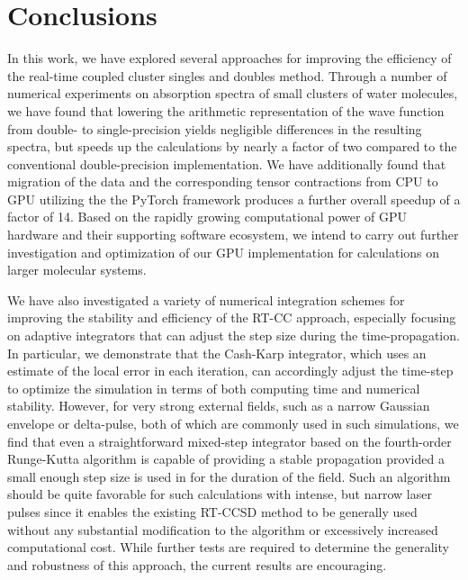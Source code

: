 \section{Conclusions} \label{conc}

In this work, we have explored several approaches for improving the
efficiency of the real-time coupled cluster singles and doubles method.
Through a number of numerical experiments on absorption spectra of small
clusters of water molecules, we have found that lowering the arithmetic
representation of the wave function from double- to single-precision yields
negligible differences in the resulting spectra, but speeds up the
calculations by nearly a factor of two compared to the conventional
double-precision implementation.  We have additionally found that migration
of the data and the corresponding tensor contractions from CPU to GPU
utilizing the the PyTorch framework produces a further overall speedup of a
factor of 14.  Based on the rapidly growing computational power of GPU
hardware and their supporting software ecosystem, we intend to carry out
further investigation and optimization of our GPU implementation for
calculations on larger molecular systems. 

We have also investigated a variety of numerical integration schemes for
improving the stability and efficiency of the RT-CC approach, especially
focusing on adaptive integrators that can adjust the step size during the
time-propagation.  In particular, we demonstrate that the Cash-Karp
integrator, which uses an estimate of the local error in each iteration, can
accordingly adjust the time-step to optimize the simulation in terms of
both computing time and numerical stability.  However, for very strong
external fields, such as a narrow Gaussian envelope or delta-pulse, both of
which are commonly used in such simulations, we find that even a
straightforward mixed-step integrator based on the fourth-order Runge-Kutta
algorithm is capable of providing a stable propagation provided a small
enough step size is used in for the duration of the field.  Such an
algorithm should be quite favorable for such calculations with intense, but
narrow laser pulses since it enables the existing RT-CCSD method to be
generally used without any substantial modification to the algorithm or
excessively increased computational cost. While further tests are required to determine the generality and robustness of
this approach, the current results are encouraging.

